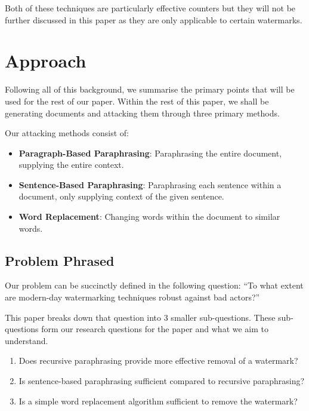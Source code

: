 \documentclass{l4proj}
\theoremstyle{definition}
\begin{document}
        Both of these techniques are particularly effective counters but they will not be further discussed in this paper as they are only applicable to certain watermarks. 

\section{Approach}  
    Following all of this background, we summarise the primary points that will be used for the rest of our paper. Within the rest of this paper, we shall be generating documents and attacking them through three primary methods.

    Our attacking methods consist of:
    \begin{itemize}
        \setlength\itemsep{0.5em}
        \item \textbf{Paragraph-Based Paraphrasing}: Paraphrasing the entire document, supplying the entire context. 
        \item \textbf{Sentence-Based Paraphrasing}: Paraphrasing each sentence within a document, only supplying context of the given sentence.
        \item \textbf{Word Replacement}: Changing words within the document to similar words.
    \end{itemize}

    
    \subsection{Problem Phrased}
        Our problem can be succinctly defined in the following question: ``To what extent are modern-day watermarking techniques robust against bad actors?''

        This paper breaks down that question into 3 smaller sub-questions. These sub-questions form our research questions for the paper and what we aim to understand.
        \begin{enumerate}[label={\textbf{RQ\arabic*}:}, leftmargin=4em]
            \label{sec:research-questions}
            \item Does recursive paraphrasing provide more effective removal of a watermark?
            \item Is sentence-based paraphrasing sufficient compared to recursive paraphrasing?
            \item Is a simple word replacement algorithm sufficient to remove the watermark?
        \end{enumerate}
\end{document}
